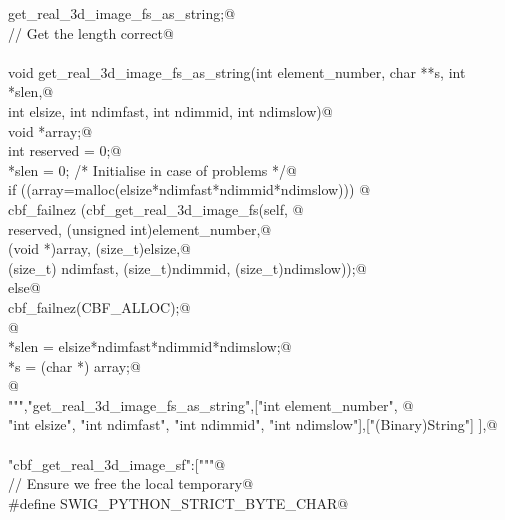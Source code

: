 \documentclass[10pt,a4paper,twoside,notitlepage]{article}
\begin{document}
\begin{flushleft}
\begin{minipage}{\linewidth}
\begin{list}{}{}
\mbox{}\verb@       get_real_3d_image_fs_as_string;@\\
\mbox{}\verb@// Get the length correct@\\
\mbox{}\verb@@\\
\mbox{}\verb@    void get_real_3d_image_fs_as_string(int element_number, char **s, int *slen,@\\
\mbox{}\verb@    int elsize, int ndimfast, int ndimmid, int ndimslow){@\\
\mbox{}\verb@        void *array;@\\
\mbox{}\verb@        int reserved = 0;@\\
\mbox{}\verb@        *slen = 0; /* Initialise in case of problems */@\\
\mbox{}\verb@        if ((array=malloc(elsize*ndimfast*ndimmid*ndimslow))) {@\\
\mbox{}\verb@               cbf_failnez (cbf_get_real_3d_image_fs(self, @\\
\mbox{}\verb@               reserved, (unsigned int)element_number,@\\
\mbox{}\verb@               (void *)array, (size_t)elsize,@\\
\mbox{}\verb@               (size_t) ndimfast, (size_t)ndimmid, (size_t)ndimslow));@\\
\mbox{}\verb@         }else{@\\
\mbox{}\verb@               cbf_failnez(CBF_ALLOC);@\\
\mbox{}\verb@         }@\\
\mbox{}\verb@        *slen = elsize*ndimfast*ndimmid*ndimslow;@\\
\mbox{}\verb@        *s = (char *) array;@\\
\mbox{}\verb@      }@\\
\mbox{}\verb@""","get_real_3d_image_fs_as_string",["int element_number", @\\
\mbox{}\verb@    "int elsize", "int ndimfast", "int ndimmid", "int ndimslow"],["(Binary)String"] ],@\\
\mbox{}\verb@@\\
\mbox{}\verb@"cbf_get_real_3d_image_sf":["""@\\
\mbox{}\verb@// Ensure we free the local temporary@\\
\mbox{}\verb@%{@\\
\mbox{}\verb@#define SWIG_PYTHON_STRICT_BYTE_CHAR@\\
\mbox{}\verb@%}@\\
\mbox{}\verb@%cstring_output_allocate_size(char ** s, int *slen, free(*$1))@\\

\end{list}
\end{minipage}
\end{flushleft}
\end{document}

